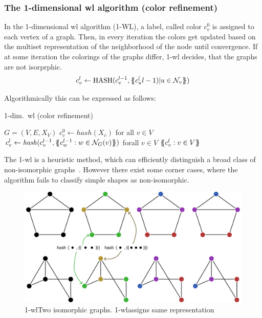 \subsubsection{The 1-dimensional \acs{wl} algorithm (color refinement)}
In the 1-dimensional \ac{wl} algorithm (1-WL), a label, called color $c_{v}^{0}$ is assigned to each
vertex of a graph. Then, in every iteration the colors get updated based on the multiset representation
of the neighborhood of the node until convergence. If at some iteration the colorings of the graphs
differ, 1-\ac{wl} decides, that the graphs are not isorprphic.
\begin{align*}
    c_{v}^{l} \leftarrow \mathrm{HASH}(c_{v}^{l-1}, \ldblbrace c_{u}^(l-1)| u \in \mathcal{N}_{v} \rdblbrace)
\end{align*}

Algorithmically this can be expressed as follows:
\begin{algorithm}
    \caption{1-dim.\ \ac{wl} (color refinement)}
    \begin{algorithmic}[1]
        \Require $G = (V,E,X_{V})$
        \State $c_{v}^{0} \gets \mathit{hash}(X_{v})$ for all $v \in V$
        \Repeat
        \State $c_{v}^{l} \gets \mathit{hash}(c_{v}^{l-1}, \ldblbrace c_{w}^{l-1}: w \in \mathcal N_{G}(v)\rdblbrace)$ forall $v \in V$
        \State \Return $\ldblbrace c_{v}^l : v \in V \rdblbrace$
    \end{algorithmic}
\end{algorithm}

The 1-\ac{wl} is a heuristic method, which can efficiently distinguish a broad class of non-isomorphic
graphs~\cite{Babai1979}.
However there exist some corner cases, where the algorithm fails to classify
simple shapes as non-isomorphic.

\begin{figure}[ht]
    \centering
    \includegraphics[width= 0.90\linewidth]{gfx/related-work/1wl-isomorph}
    \caption{1-\ac{wl}Two isomorphic graphs. 1-\ac{wl}assigns same
        representation}\label{fig:related:1-wl-indistinguishable}
\end{figure}

